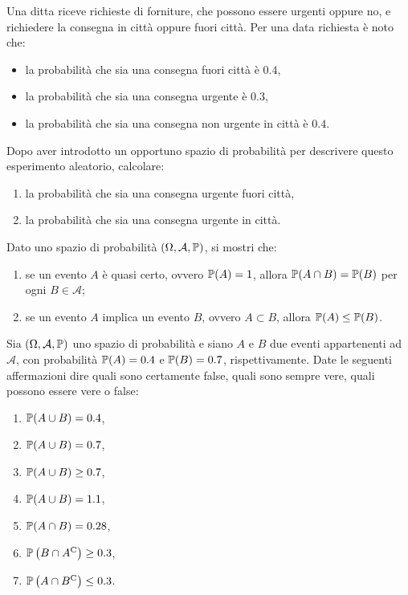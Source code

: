 Una ditta riceve richieste di forniture, che possono essere urgenti oppure no, e richiedere la consegna in città oppure fuori città. Per una data richiesta è noto che:
\begin{itemize}
\item la probabilità che sia una consegna fuori città è $0.4$,
\item la probabilità che sia una consegna urgente è $0.3$,
\item la probabilità che sia una consegna non urgente in città è $0.4$.
\end{itemize}

Dopo aver introdotto un opportuno spazio di probabilità per descrivere questo esperimento aleatorio, calcolare:
\begin{enumerate}
\item la probabilità che sia una consegna urgente fuori città,
\item la probabilità che sia una consegna urgente in città.
\end{enumerate}
\Esercizio{}

Dato uno spazio di probabilità $( \Omega ,\mathcal{A} ,\mathbb{P})$, si mostri che:
\begin{enumerate}
\item se un evento $A$ è quasi certo, ovvero $\mathbb{P}( A) =1$, allora $\mathbb{P}( A\cap B) =\mathbb{P}( B)$ per ogni $B\in \mathcal{A}$;
\item se un evento $A$ implica un evento $B$, ovvero $A\subset B$, allora $\mathbb{P}( A) \leq \mathbb{P}( B)$.
\end{enumerate}
\Esercizio{}

Sia $( \Omega ,\mathcal{A} ,\mathbb{P})$ uno spazio di probabilità e siano $A$ e $B$ due eventi appartenenti ad $\mathcal{A}$, con probabilità $\mathbb{P}( A) =0.4$ e $\mathbb{P}( B) =0.7$, rispettivamente. Date le seguenti affermazioni dire quali sono certamente false, quali sono sempre vere, quali possono essere vere o false:
\begin{enumerate}
\item $\mathbb{P}( A\cup B) =0.4$,
\item $\mathbb{P}( A\cup B) =0.7$,
\item $\mathbb{P}( A\cup B) \geq 0.7$,
\item $\mathbb{P}( A\cup B) =1.1$,
\item $\mathbb{P}( A\cap B) =0.28$,
\item $\mathbb{P}\left( B\cap A^{\mathrm{C}}\right) \geq 0.3$,
\item $\mathbb{P}\left( A\cap B^{\mathrm{C}}\right) \leq 0.3$.
\end{enumerate}
\Esercizio{}

